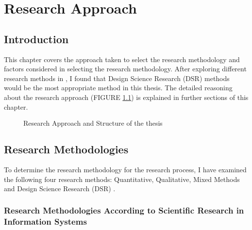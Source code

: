 
\chapter{Research Approach} %

\label{Chapter6_research-approach} %

\section{Introduction }
This chapter covers the approach taken to select the research methodology and factors considered in selecting the research methodology. After exploring different research methods in 
\citep{recker2012scientific}, 
I found that Design Science Research (DSR) methods would be the most appropriate method in this thesis. 
The detailed reasoning about the research approach 
(FIGURE \ref{fig:Research Flow})
is explained in further sections of this chapter.

\begin{figure}[ht]
    \centering
    \caption{Research Approach and Structure of the thesis}
    \label{fig:Research Flow}
\end{figure}
\section{Research Methodologies } 

To determine the research methodology for the research process, 
I have examined the following four research methods:  
Quantitative, Qualitative, Mixed Methods and Design Science Research (DSR)
\citep{recker2012scientific}.

\subsection{Research Methodologies According to Scientific Research in Information Systems}


